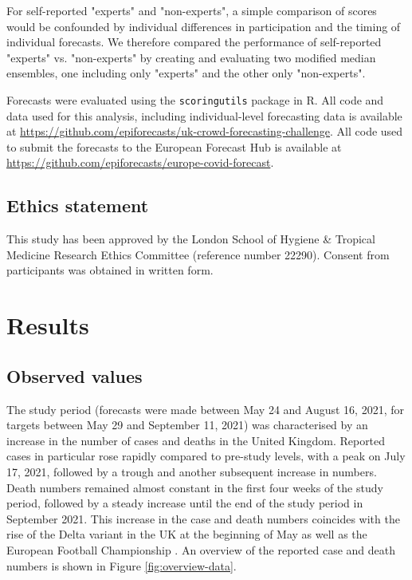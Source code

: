 \documentclass[10pt,a4paper,twocolumn]{article}
\begin{document}
For self-reported "experts" and "non-experts", a simple comparison of scores would be confounded by individual differences in participation and the timing of individual forecasts. We therefore compared the performance of self-reported "experts" vs. "non-experts" by creating and evaluating two modified median ensembles, one including only "experts" and the other only "non-experts".


Forecasts were evaluated using the \texttt{scoringutils} \citep{bosseEvaluatingForecastsScoringutils2022} package in \textsf{R}. All code and data used for this analysis, including individual-level forecasting data is available at \url{https://github.com/epiforecasts/uk-crowd-forecasting-challenge}. All code used to submit the forecasts to the European Forecast Hub is available at \url{https://github.com/epiforecasts/europe-covid-forecast}. 

\subsection*{Ethics statement}
This study has been approved by the London School of Hygiene \& Tropical Medicine Research Ethics Committee (reference number 22290). Consent from participants was obtained in written form.



\section*{Results}

\subsection*{Observed values}

The study period (forecasts were made between May 24 and August 16, 2021, for targets between May 29 and September 11, 2021) was characterised by an increase in the number of cases and deaths in the United Kingdom. Reported cases in particular rose rapidly compared to pre-study levels, with a peak on July 17, 2021, followed by a trough and another subsequent increase in numbers. Death numbers remained almost constant in the first four weeks of the study period, followed by a steady increase until the end of the study period in September 2021. This increase in the case and death numbers coincides with the rise of the Delta variant in the UK at the beginning of May \citep{bastIncreasedRiskHospitalisation2021, perez-guzmanEpidemiologicalDriversTransmissibility2023} as well as the  European Football Championship \citep{dehningImpactEuro20202023}. An overview of the reported case and death numbers is shown in Figure \ref{fig:overview-data}. 
\end{document}
